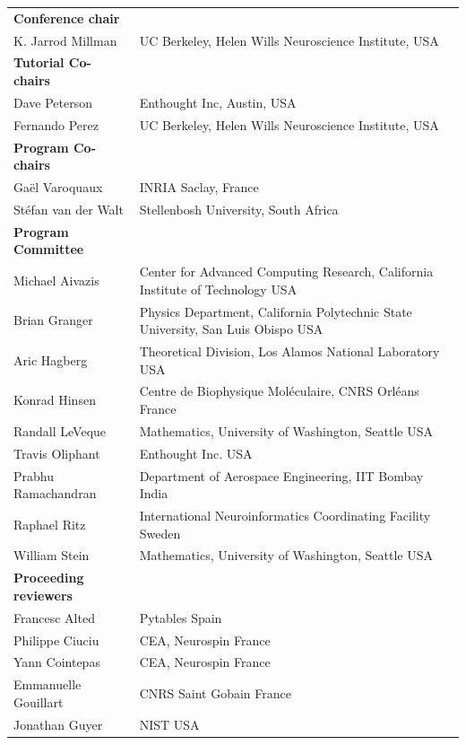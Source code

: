 \def\bfsf{\bfseries\sffamily }

\begin{tabular}{p{3.7cm}p{}}
{\bfsf Conference chair}&\\
K. Jarrod Millman & UC Berkeley, Helen Wills Neuroscience Institute, {\sc
USA}\\
\smallskip
{\bfsf Tutorial Co-chairs}&\\
Dave Peterson & Enthought Inc, Austin, {\sc USA} \\
Fernando Perez & UC Berkeley, Helen Wills Neuroscience Institute, {\sc
USA}\\
\smallskip
{\bfsf Program Co-chairs}&\\
Ga\"el Varoquaux & INRIA Saclay, {\sc France} \\
St\'efan van der Walt & Stellenbosh University, {\sc South Africa}\\
\smallskip
{\bfsf Program Committee}&\\
Michael Aivazis & Center for Advanced Computing Research, California
Institute of Technology {\sc USA}\\
Brian Granger & Physics Department, California Polytechnic State
University, San Luis Obispo {\sc USA} \\
Aric Hagberg & Theoretical Division, Los Alamos National Laboratory
{\sc USA} \\
Konrad Hinsen & Centre de Biophysique Mol\'eculaire, CNRS Orl\'eans {\sc
France} \\
Randall LeVeque & Mathematics, University of Washington, Seattle {\sc
USA}\\
Travis Oliphant & Enthought Inc. {\sc USA} \\
Prabhu Ramachandran & Department of Aerospace Engineering, IIT Bombay
{\sc India}\\
Raphael Ritz & International Neuroinformatics Coordinating Facility
{\sc Sweden}\\
William Stein & Mathematics, University of Washington, Seattle {\sc USA}\\
\smallskip
{\bfsf Proceeding reviewers}&\\
Francesc Alted & Pytables {\sc Spain}\\
Philippe Ciuciu & CEA, Neurospin {\sc France}\\
Yann Cointepas &  CEA, Neurospin {\sc France}\\
Emmanuelle Gouillart & CNRS Saint Gobain {\sc France}\\
Jonathan Guyer & NIST {\sc USA}\\

\end{tabular}
